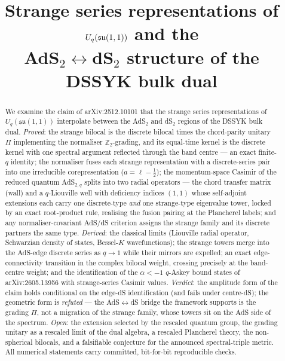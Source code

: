 \documentclass[11pt,a4paper]{article}
\title{Strange series representations of $\Uq$ and the\\
       AdS$_2\leftrightarrow$dS$_2$ structure of the DSSYK bulk dual}
\author{}
\date{}
\theoremstyle{definition}
\theoremstyle{plain}
\newcommand{\Uq}{U_q(\mathfrak{su}(1,1))}
\newcommand{\Z}{\mathbb{Z}}
\begin{document}
\maketitle

\begin{abstract}
\noindent We examine the claim of arXiv:2512.10101 that the strange series representations
of $\Uq$ interpolate between the AdS$_2$ and dS$_2$ regions of the DSSYK bulk dual.
\emph{Proved}: the strange bilocal is the discrete bilocal times the chord-parity unitary
$\Pi$ implementing the normaliser $\Z_2$-grading, and its equal-time kernel is the discrete
kernel with one spectral argument reflected through the band centre --- an exact finite-$q$
identity; the normaliser fuses each strange representation with a discrete-series pair into
one irreducible corepresentation ($a=\ell-\tfrac12$); the momentum-space Casimir of the
reduced quantum AdS$_{2,q}$ splits into two radial operators --- the chord transfer matrix
(wall) and a $q$-Liouville well with deficiency indices $(1,1)$ whose self-adjoint
extensions each carry one discrete-type \emph{and} one strange-type eigenvalue tower,
locked by an exact root-product rule, realising the fusion pairing at the Plancherel
labels; and any normaliser-covariant AdS/dS criterion assigns the strange family and its
discrete partners the same type. \emph{Derived}: the classical limits (Liouville radial
operator, Schwarzian density of states, Bessel-$K$ wavefunctions); the strange towers
merge into the AdS-edge discrete series as $q\to1$ while their mirrors are expelled; an
exact edge-connectivity transition in the complex bilocal weight, crossing precisely at
the band-centre weight; and the identification of the $\alpha<-1$ $q$-Askey bound states
of arXiv:2605.13956 with strange-series Casimir values. \emph{Verdict}: the amplitude
form of the claim holds conditional on the edge-dS identification (and fails under
centre-dS); the geometric form is \emph{refuted} --- the AdS$\leftrightarrow$dS bridge the
framework supports is the grading $\Pi$, not a migration of the strange family, whose
towers sit on the AdS side of the spectrum. \emph{Open}: the extension selected by the
rescaled quantum group, the grading unitary as a rescaled limit of the dual algebra, a
rescaled Plancherel theory, the non-spherical bilocals, and a falsifiable conjecture for
the announced spectral-triple metric. All numerical statements carry committed,
bit-for-bit reproducible checks.
\end{abstract}

\tableofcontents
\end{document}
